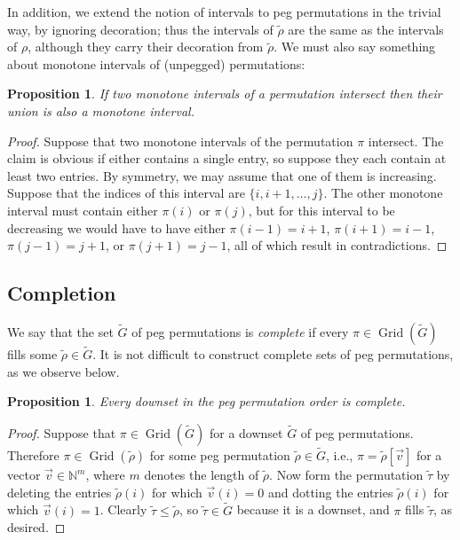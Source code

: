 \documentclass[10pt]{article}
\theoremstyle{plain}
\newtheorem{proposition}[theorem]{Proposition}
\theoremstyle{definition}
\newcommand{\Grid}{\operatorname{Grid}}
\begin{document}
In addition, we extend the notion of intervals to peg permutations in the trivial way, by ignoring decoration; thus the intervals of $\tilde{\rho}$ are the same as the intervals of $\rho$, although they carry their decoration from $\tilde{\rho}$. We must also say something about monotone intervals of (unpegged) permutations:

\begin{proposition}\label{prop-mono-intervals-intersection}
If two monotone intervals of a permutation intersect then their union is also a monotone interval.
\end{proposition}
\begin{proof}
Suppose that two monotone intervals of the permutation $\pi$ intersect. The claim is obvious if either contains a single entry, so suppose they each contain at least two entries. By symmetry, we may assume that one of them is increasing. Suppose that the indices of this interval are $\{i,i+1,\dots,j\}$. The other monotone interval must contain either $\pi(i)$ or $\pi(j)$, but for this interval to be decreasing we would have to have either $\pi(i-1)=i+1$, $\pi(i+1)=i-1$, $\pi(j-1)=j+1$, or $\pi(j+1)=j-1$, all of which result in contradictions.
\end{proof}

\subsection{Completion}

We say that the set $\tilde{G}$ of peg permutations is \emph{complete} if every $\pi\in\Grid(\tilde{G})$ fills some $\tilde{\rho}\in\tilde{G}$. It is not difficult to construct complete sets of peg permutations, as we observe below.

\begin{proposition}
\label{prop-CTI-complete}
Every downset in the peg permutation order is complete.
\end{proposition}
\begin{proof}
Suppose that $\pi\in\Grid(\tilde{G})$ for a downset $\tilde{G}$ of peg permutations. Therefore $\pi\in\Grid(\tilde{\rho})$ for some peg permutation $\tilde{\rho}\in\tilde{G}$, i.e., $\pi=\tilde{\rho}[\vec{v}]$ for a vector $\vec{v}\in\mathbb{N}^m$, where $m$ denotes the length of $\tilde{\rho}$. Now form the permutation $\tilde{\tau}$ by deleting the entries $\tilde{\rho}(i)$ for which $\vec{v}(i)=0$ and dotting the entries $\tilde{\rho}(i)$ for which $\vec{v}(i)=1$. Clearly $\tilde{\tau}\le\tilde{\rho}$, so $\tilde{\tau}\in\tilde{G}$ because it is a downset, and $\pi$ fills $\tilde{\tau}$, as desired.
\end{proof}
\end{document}
